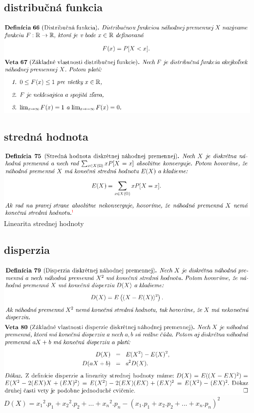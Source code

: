 \subsection {distribučná funkcia}
\includegraphics[width=1\textwidth]{images/pravdepodobnost/dist_funk}\\
\subsection {stredná hodnota}
\includegraphics[width=1\textwidth]{images/pravdepodobnost/stred_hod}\\
Linearita strednej hodnoty\\
\subsection {disperzia}
\includegraphics[width=1\textwidth]{images/pravdepodobnost/disp}\\
\includegraphics[width=1\textwidth]{images/pravdepodobnost/disp_II}\\
$D(X) = {x_1}^2.p_1 + {x_2}^2.p_2 + ... + {x_n}^2.p_n - (x_1.p_1 + x_2.p_2 + ... + x_n.p_n)^2$\\
